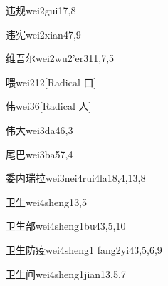 \begin{verbete}{违规}{wei2gui1}{7,8}
\end{verbete}

\begin{verbete}{违宪}{wei2xian4}{7,9}
\end{verbete}

\begin{verbete}{维吾尔}{wei2wu2'er3}{11,7,5}
\end{verbete}

\begin{verbete}{喂}{wei2}{12}[Radical 口]
\end{verbete}

\begin{verbete}{伟}{wei3}{6}[Radical 人]
\end{verbete}

\begin{verbete}{伟大}{wei3da4}{6,3}
\end{verbete}

\begin{verbete}{尾巴}{wei3ba5}{7,4}
\end{verbete}

\begin{verbete}{委内瑞拉}{wei3nei4rui4la1}{8,4,13,8}
\end{verbete}

\begin{verbete}{卫生}{wei4sheng1}{3,5}
\end{verbete}

\begin{verbete}{卫生部}{wei4sheng1bu4}{3,5,10}
\end{verbete}

\begin{verbete}{卫生防疫}{wei4sheng1 fang2yi4}{3,5,6,9}
\end{verbete}

\begin{verbete}{卫生间}{wei4sheng1jian1}{3,5,7}
\end{verbete}

